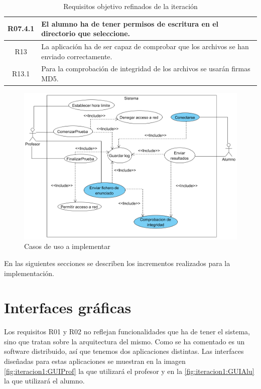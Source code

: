 \begin{table}
\begin{tabular}{|c|p{10cm}|}
        R07.4.1 & El alumno ha de tener permisos de escritura en el directorio que seleccione.
        \\ \hline

        R13 & La aplicación ha de ser capaz de comprobar que los archivos se han enviado correctamente.
        \\ \hline
        
        R13.1 & Para la comprobación de integridad de los archivos se usarán firmas MD5.
        \\ \hline

    \end{tabular}
    \label{tabla:iteracion1:requisitosObjetivoRefinados}
    \caption{Requisitos objetivo refinados de la iteración}
\end{table}


\begin{figure}[]
    \centering
    \includegraphics[width=.90\linewidth]{iteracion1/casosUso}
    \caption{Casos de uso a implementar}
    \label{fig:iteracion1:casosUso}
\end{figure}


En las siguientes secciones se describen los incrementos realizados para la implementación.


\section{Interfaces gráficas}

Los requisitos R01 y R02 no reflejan funcionalidades que ha de tener el sistema, sino que tratan sobre la arquitectura del mismo. Como se ha comentado es un software distribuido, así que tenemos dos aplicaciones distintas. Las interfaces diseñadas para estas aplicaciones se muestran en la imagen \ref{fig:iteracion1:GUIProf} la que utilizará el profesor y en la \ref{fig:iteracion1:GUIAlu} la que utilizará el alumno.


